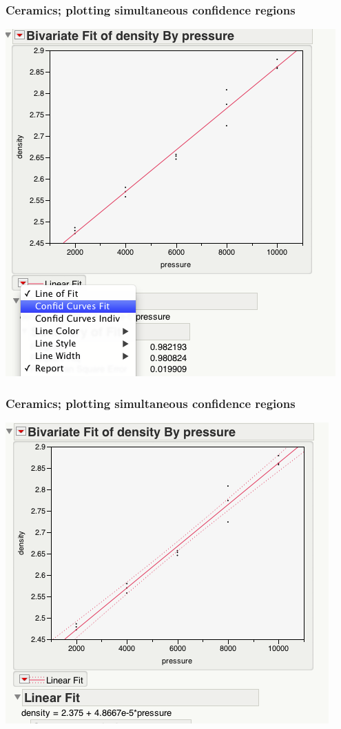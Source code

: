 \documentclass[handout]{beamer}\usepackage{graphicx, color}
\numberwithin{equation}{section}
\begin{document}
\begin{frame}
\frametitle{Ceramics; plotting simultaneous confidence regions}
 \includegraphics{../../fig/scp1.png}
\end{frame}


\begin{frame}
\frametitle{Ceramics; plotting simultaneous confidence regions}
 \includegraphics{../../fig/scp2.png}
\end{frame}
\end{document}
